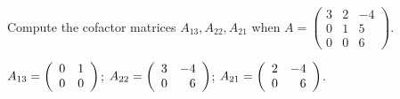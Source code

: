 \documentclass{ximera}
\begin{document}
\begin{exercise} \label{c10.1.b7a}
Compute the cofactor matrices $A_{13}, A_{22}, A_{21}$ when 
$A = \left( \begin{array}{rrr}
 3 & 2 & -4\\
 0 & 1 & 5\\
 0 & 0 & 6\end{array} \right)$.

\begin{solution}
\ans
$A_{13} = \left(\begin{array}{rr} 0 & 1\\ 0 &0\end{array}\right)$;
$A_{22} = \left(\begin{array}{rr} 3 & -4\\ 0 &6\end{array}\right)$;
$A_{21} = \left(\begin{array}{rr} 2 & -4\\ 0 &6\end{array}\right)$.

\end{solution}
\end{exercise}
\end{document}

